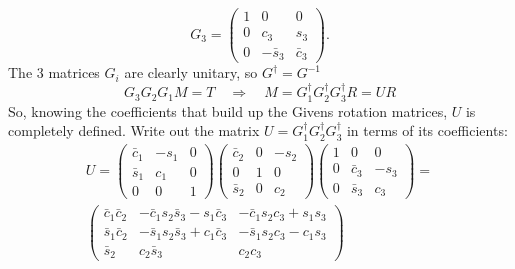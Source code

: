 \documentclass[a4paper,10pt]{article}
\begin{document}
\begin{displaymath}
 G_{3} = \left(\begin{array}{ccc}1&0&0\\0&c_{3}&s_{3}\\0&-\bar{s}_{3}&\bar{c}_{3}\end{array}\right).
\end{displaymath}
The $3$ matrices $G_{i}$ are clearly unitary, so $G^{\dagger}=G^{-1}$
\begin{displaymath}
 G_{3}G_{2}G_{1}M=T \quad \Rightarrow \quad M = G_{1}^{\dagger}G_{2}^{\dagger}G_{3}^{\dagger}R =UR
\end{displaymath}
So, knowing the coefficients that build up the Givens rotation matrices, $U$ is completely defined. Write out the matrix $U=G_{1}^{\dagger}G_{2}^{\dagger}G_{3}^{\dagger}$ in terms of its coefficients:
\begin{eqnarray*}
 U=\left(\begin{array}{ccc}\bar{c}_{1}&-s_{1}&0\\\bar{s}_{1}&c_{1}&0\\0&0&1 \end{array}\right)
\left(\begin{array}{ccc}\bar{c}_{2}&0&-s_{2}\\0&1&0\\\bar{s}_{2}&0&c_{2} \end{array}\right)
\left(\begin{array}{ccc}1&0&0\\0&\bar{c}_{3}&-s_{3}\\0&\bar{s}_{3}&c_{3}\end{array}\right)=\\
\left(\begin{array}{ccc}
\bar{c}_{1}\bar{c}_{2} & -\bar{c}_{1}s_{2}\bar{s}_{3} - s_{1}\bar{c}_{3} & -\bar{c}_{1}s_{2}c_{3} + s_{1}s_{3}\\
\bar{s}_{1}\bar{c}_{2} & -\bar{s}_{1}s_{2}\bar{s}_{3} + c_{1}\bar{c}_{3} & -\bar{s}_{1}s_{2}c_{3} - c_{1}s_{3}\\
\bar{s}_{2} & c_{2}\bar{s}_{3} & c_{2}c_{3}
\end{array}\right)
\end{eqnarray*}
\end{document}
